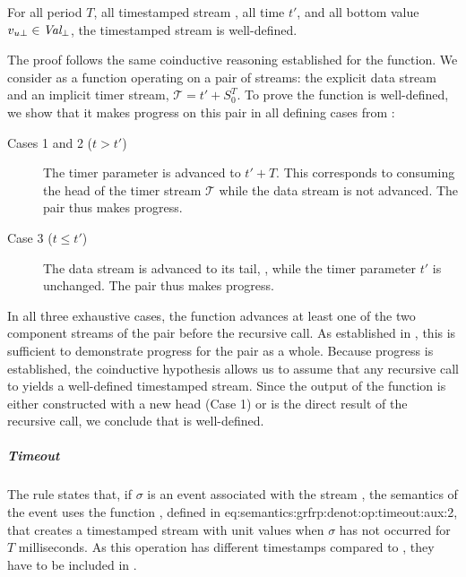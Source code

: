 \begin{lemma}
    For all period $T$, all timestamped stream \ts, all time $t'$, and all bottom value
    $v_{u\bot} \in \textit{Val}_\bot$, the timestamped stream  is well-defined.
\end{lemma}
\begin{skippableproof}
    The proof follows the same coinductive reasoning established for the  function. We
    consider  as a function operating on a pair of streams: the explicit data stream
    \ts and an implicit timer stream, $\mathcal{T} = t' + S_0^T$.
    To prove the function is well-defined, we show that it makes progress on this pair in all
    defining cases from :
    \begin{description}
        \item[Cases 1 and 2 ($t > t'$)] The timer parameter is advanced to $t' + T$. This
              corresponds to consuming the head of the timer stream $\mathcal{T}$ while the data
              stream \ts is not advanced. The pair thus makes progress.

        \item[Case 3 ($t \le t'$)] The data stream is advanced to its tail, \ts, while the timer
              parameter $t'$ is unchanged. The pair thus makes progress.
    \end{description}
    In all three exhaustive cases, the function advances at least one of the two component streams
    of the pair before the recursive call. As established in
    , this is sufficient to demonstrate progress
    for the pair as a whole.
    Because progress is established, the coinductive hypothesis allows us to assume that any
    recursive call to  yields a well-defined timestamped stream. Since the output of
    the function is either constructed with a new head (Case 1) or is the direct result of the
    recursive call, we conclude that  is well-defined.
\end{skippableproof}

\subparagraph{Timeout}

The rule  states that, if $\sigma$ is an event
associated with the stream \ts, the semantics of the event  uses the function
, defined in 
{eq:semantics:grfrp:denot:op:timeout:aux:2}, that creates a timestamped stream with unit values when
$\sigma$ has not occurred for $T$ milliseconds.
%
As this operation has different timestamps compared to \ts, they have to be included in \tck.

